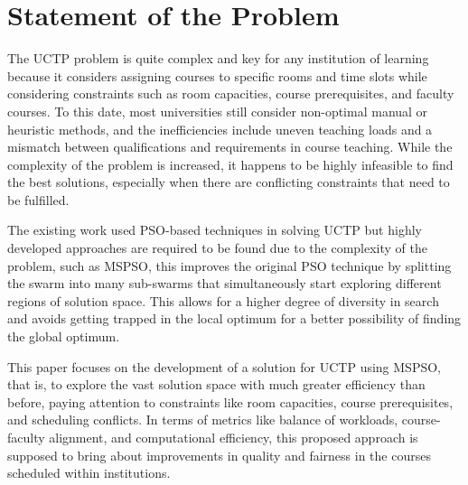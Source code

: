 \section{Statement of the Problem}
\label{sec:problemstatement}

The UCTP problem is quite complex and key for any institution of learning because it considers assigning courses to specific rooms and time slots while considering constraints such as room capacities, course prerequisites, and faculty courses. \cite{Arratia-Martinez2021-io} To this date, most universities still consider non-optimal manual or heuristic methods, and the inefficiencies include uneven teaching loads and a mismatch between qualifications and requirements in course teaching. \cite{Oswald_C2013-zo} \cite{Gunawan2008-ga} While the complexity of the problem is increased, it happens to be highly infeasible to find the best solutions, especially when there are conflicting constraints that need to be fulfilled. 

The existing work \cite{Oswald_C2013-zo} \cite{Ali2014-mb} \cite{Chen2013-cp} used PSO-based techniques in solving UCTP but highly developed approaches are required to be found due to the complexity of the problem, such as MSPSO, this improves the original PSO technique by splitting the swarm into many sub-swarms that simultaneously start exploring different regions of solution space. This allows for a higher degree of diversity in search and avoids getting trapped in the local optimum for a better possibility of finding the global optimum.

This paper focuses on the development of a solution for UCTP using MSPSO, that is, to explore the vast solution space with much greater efficiency than before, paying attention to constraints like room capacities, course prerequisites, and scheduling conflicts. In terms of metrics like balance of workloads, course-faculty alignment, and computational efficiency, this proposed approach is supposed to bring about improvements in quality and fairness in the courses scheduled within institutions.
